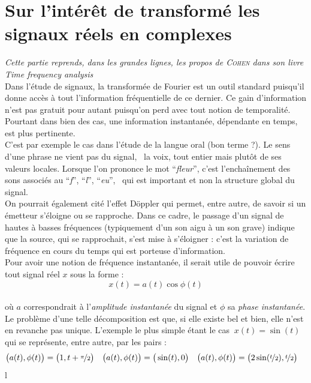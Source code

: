 \section{Sur l'intérêt de transformé les signaux réels en complexes}\label{sec:temp-freq}


\textit{Cette partie reprends, dans les grandes lignes, les propos de \textsc{Cohen} dans son livre \emph{Time frequency analysis} \cite{cohen_time_1995}}
\\
Dans l'étude de signaux, la transformée de Fourier est un outil standard puisqu'il donne accès à tout l'information fréquentielle de ce dernier. Ce gain d'information n'est pas gratuit pour autant puisqu'on perd avec tout notion de temporalité. Pourtant dans bien des cas, une information instantanée, dépendante en temps, est plus pertinente.
\\
C'est par exemple le cas dans l'étude de la langue oral (bon terme ?). Le sens d'une phrase ne vient pas du signal, \ie~la voix, tout entier mais plutôt de ses valeurs locales. Lorsque l'on prononce le mot ``\textit{fleur}'', c'est l’enchaînement des sons associés au ``\textit{f}'', ``\textit{l}'', ``\textit{eu}'', \etc~qui est important et non la structure global du signal.  
\\
On pourrait également cité l'effet Döppler qui permet, entre autre, de savoir si un émetteur s'éloigne ou se rapproche. Dans ce cadre, le passage d'un signal de hautes à basses fréquences (typiquement d'un son aigu à un son grave) indique que la source, qui se rapprochait, s'est mise à s'éloigner : c'est la variation de fréquence en cours du temps qui est porteuse d'information.
\\

Pour avoir une notion de fréquence instantanée, il serait utile de pouvoir écrire tout signal réel $x$ sous la forme :
\begin{equation}\label{eq:amp-phase_instant}
	x(t) = a(t) \cos\phi(t)
\end{equation}
\\
où $a$ correspondrait à l'\textit{amplitude instantanée} du signal et $\phi$ sa \textit{phase instantanée}. Le problème d'une telle décomposition est que, si elle existe bel et bien, elle n'est en revanche pas unique. L'exemple le plus simple étant le cas $\ x(t) = \sin(t)\ $ qui se représente, entre autre, par les pairs :
\begin{align*}
	\big(a(t),\phi(t)\big) &= \big(1, t+\nicefrac{\pi}{2}\big)  &  
	\big(a(t),\phi(t)\big) &= \big(\sin(t), 0\big)  &  
	\big(a(t),\phi(t)\big) &= \big(2\sin(\nicefrac{t}{2}), \nicefrac{t}{2}\big)
\end{align*}
{\color{white}l}

